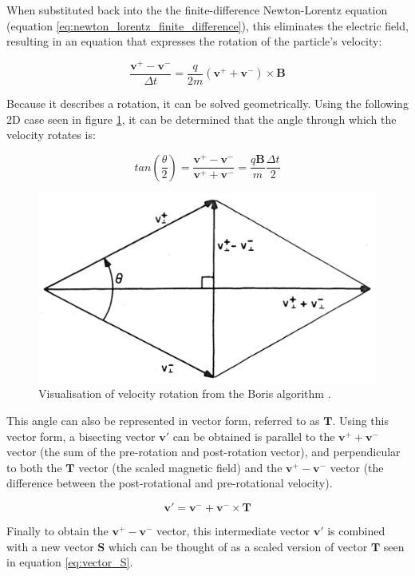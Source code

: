 When substituted back into the the finite-difference Newton-Lorentz equation (equation \ref{eq:newton_lorentz_finite_difference}), this eliminates the electric field, resulting in an equation that expresses the rotation of the particle's velocity:

\begin{equation}
	\frac{\bm{v^+} - \bm{v^-}}{\Delta t} = \frac{q}{2m} (\bm{v^+} + \bm{v^-}) \times \bm{B}
\end{equation}

Because it describes a rotation, it can be solved geometrically. Using the following 2D case seen in figure \ref{fig:boris_rotation}, it can be determined that the angle through which the velocity rotates is:

\begin{equation}
	tan \left(\frac{\theta}{2} \right) = \frac{\bm{v^+} - \bm{v^-}}{\bm{v^+} + \bm{v^-}} = \frac{q\bm{B}}{m} \frac{\Delta t}{2}
\end{equation}

\begin{figure}[b!]
	\centering
	\includegraphics[width=0.6\linewidth]{particle_in_cell/figures/boris_rotation.png}
	\caption{Visualisation of velocity rotation from the Boris algorithm \cite{Birdsall2004}.}
	\label{fig:boris_rotation}
\end{figure} 

This angle can also be represented in vector form, referred to as $\bm{T}$. Using this vector form, a bisecting vector $\bm{v'}$ can be obtained is parallel to the $\bm{v^+} + \bm{v^-}$ vector (the sum of the pre-rotation and post-rotation vector), and perpendicular to both the $\bm{T}$ vector (the scaled magnetic field) and the $\bm{v^+} - \bm{v^-}$ vector (the difference between the post-rotational and pre-rotational velocity). 

\begin{equation}
	\bm{v'} = \bm{v^-} + \bm{v^-} \times \bm{T}
	\label{eq:boris_magnetic_1}
\end{equation}

Finally to obtain the $\bm{v^+} - \bm{v^-}$ vector, this intermediate vector $\bm{v'}$ is combined with a new vector $\bm{S}$ which can be thought of as a scaled version of vector $\bm{T}$ seen in equation \ref{eq:vector_S}. 


